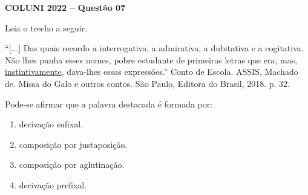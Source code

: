 \textbf{COLUNI 2022 -- Questão 07}\par\medskip Leia o trecho a seguir.

\par

“[...] Das quais recordo a interrogativa, a admirativa, a dubitativa e a cogitativa. Não lhes punha esses nomes, pobre estudante de primeiras letras que era; mas, \underline{instintivamente}, dava-lhes essas expressões.” Conto de Escola. ASSIS, Machado de. Missa do Galo e outros contos. São Paulo, Editora do Brasil, 2018. p. 32.

\par

Pode-se afirmar que a palavra destacada é formada por:\begin{enumerate}
\item derivação sufixal.
\item composição por justaposição.
\item composição por aglutinação.
\item derivação prefixal.\end{enumerate}
